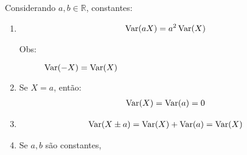\begin{description}
             Considerando $a,b \in \mathbb{R}$, constantes:
             \begin{enumerate}[label=(\alph*)]
               \item 
                 \begin{align*}
                 \operatorname{Var}(aX)=a^2\operatorname{Var}(X)
               \end{align*}
                 \begin{description}
                   \item[Obs:] $\operatorname{Var}(-X)=\operatorname{Var}(X)$
               \end{description}
               \item Se $X=a$, então:
                 \begin{align*}
    \operatorname{Var}(X)=\operatorname{Var}(a)=0
               \end{align*}
             \item 
               \begin{align*}
               \operatorname{Var}(X \pm a)=\operatorname{Var}(X)+\operatorname{Var}(a)=\operatorname{Var}(X)
             \end{align*}
             \item Se $a,b$ são constantes,


\end{enumerate}
\end{description}
